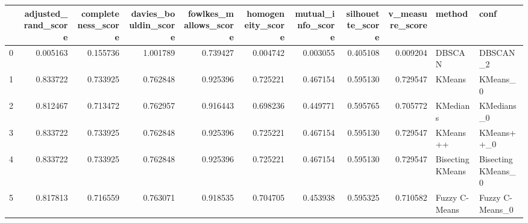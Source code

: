 \begin{tabular}{lrrrrrrrrll}
\toprule
{} &  adjusted\_rand\_score &  completeness\_score &  davies\_bouldin\_score &  fowlkes\_mallows\_score &  homogeneity\_score &  mutual\_info\_score &  silhouette\_score &  v\_measure\_score &            method &                conf \\
\midrule
0 &             0.005163 &            0.155736 &              1.001789 &               0.739427 &           0.004742 &           0.003055 &          0.405108 &         0.009204 &            DBSCAN &            DBSCAN\_2 \\
1 &             0.833722 &            0.733925 &              0.762848 &               0.925396 &           0.725221 &           0.467154 &          0.595130 &         0.729547 &            KMeans &            KMeans\_0 \\
2 &             0.812467 &            0.713472 &              0.762957 &               0.916443 &           0.698236 &           0.449771 &          0.595765 &         0.705772 &          KMedians &          KMedians\_0 \\
3 &             0.833722 &            0.733925 &              0.762848 &               0.925396 &           0.725221 &           0.467154 &          0.595130 &         0.729547 &          KMeans++ &          KMeans++\_0 \\
4 &             0.833722 &            0.733925 &              0.762848 &               0.925396 &           0.725221 &           0.467154 &          0.595130 &         0.729547 &  Bisecting KMeans &  Bisecting KMeans\_0 \\
5 &             0.817813 &            0.716559 &              0.763071 &               0.918535 &           0.704705 &           0.453938 &          0.595325 &         0.710582 &     Fuzzy C-Means &     Fuzzy C-Means\_0 \\
\bottomrule
\end{tabular}
